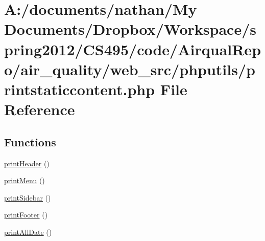 \hypertarget{printstaticcontent_8php}{\section{A\-:/documents/nathan/\-My Documents/\-Dropbox/\-Workspace/spring2012/\-C\-S495/code/\-Airqual\-Repo/air\-\_\-quality/web\-\_\-src/phputils/printstaticcontent.php File Reference}
\label{printstaticcontent_8php}
}
\subsection*{Functions}
\begin{DoxyCompactItemize}
\item 
\hyperlink{printstaticcontent_8php_a17bb8cfec1adb86ac32d5c4a29078065}{print\-Header} ()
\item 
\hyperlink{printstaticcontent_8php_a16a90076b774291a26aee85ed19e69f3}{print\-Menu} ()
\item 
\hyperlink{printstaticcontent_8php_a19f77a58e44283f733f081feea935505}{print\-Sidebar} ()
\item 
\hyperlink{printstaticcontent_8php_a193b3174e43fdc0f5244383b35bbd599}{print\-Footer} ()
\item 
\hyperlink{printstaticcontent_8php_a2ef009cda0d0973d6630826b719c3c2c}{print\-All\-Date} ()
\end{DoxyCompactItemize}


